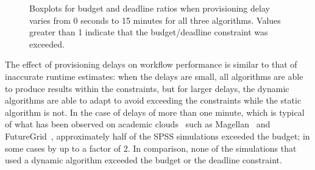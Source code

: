 \documentclass[conference]{IEEEtran}
\begin{document}
\begin{figure}[tb]
    \centering
    \hspace{2cm}
    \caption{Boxplots for budget and deadline ratios when provisioning delay 
    varies from 0 seconds to 15 minutes for all three algorithms. Values 
    greater than 1 indicate that the budget/deadline constraint was exceeded.}
    \label{fig:delays}
\end{figure}

The effect of provisioning delays on workflow performance is similar to that of
inaccurate runtime estimates: when the delays are small, all algorithms are able
to produce results within the constraints, but for larger delays, the dynamic
algorithms are able to adapt to avoid exceeding the constraints while the static
algorithm is not. In the case of delays of more than one minute, which is
typical of what has been observed on academic clouds~\cite{Juve2011} such as
Magellan~\cite{Magellan} and FutureGrid~\cite{FutureGrid}, approximately half of
the SPSS simulations exceeded the budget; in some cases by up to a factor of 2.
In comparison, none of the simulations that used a dynamic algorithm exceeded
the budget or the deadline constraint.
\end{document}
